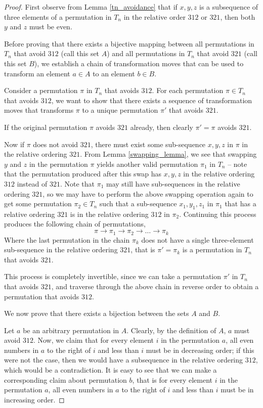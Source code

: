 \documentclass[11pt,letterpaper,twoside,english]{article}
\theoremstyle{theorem}
\theoremstyle{remark}
\begin{document}
\begin{proof}
First observe from Lemma \ref{tn_avoidance} that if $x, y, z$ is a subsequence of three elements of a permutation in $T_n$ in the relative order $312$ or $321$, then both $y$ and $z$ must be even.

Before proving that there exists a bijective mapping between all permutations in $T_n$ that avoid $312$ (call this set $A$) and all permutations in $T_n$ that avoid $321$ (call this set $B$), we establish a chain of transformation moves that can be used to transform an element $a \in A$ to an element $b \in B$.

Consider a permutation $\pi$ in $T_n$ that avoids $312$. For each permutation $\pi \in T_n$ that avoids $312$, we want to show that there exists a sequence of transformation moves that transforms $\pi$ to a unique permutation $\pi'$ that avoids $321$.

If the original permutation $\pi$ avoids $321$ already, then clearly $\pi' = \pi$ avoids $321$.

Now if $\pi$ does not avoid $321$, there must exist some sub-sequence $x, y, z$ in $\pi$ in the relative ordering $321$. From Lemma \ref{swapping_lemma}, we see that swapping $y$ and $z$ in the permutation $\pi$ yields another valid permutation $\pi_1$ in $T_n$ -- note that the permutation produced after this swap has $x, y, z$ in the relative ordering $312$ instead of $321$. Note that $\pi_1$ may still have sub-sequences in the relative ordering $321$, so we may have to perform the above swapping operation again to get some permutation $\pi_2 \in T_n$ such that a sub-sequence $x_1, y_1, z_1$ in $\pi_1$ that has a relative ordering $321$ is in the relative ordering $312$ in $\pi_2$. Continuing this process produces the following chain of permutations,
$$\pi \rightarrow \pi_1 \rightarrow \pi_2 \rightarrow \ldots \rightarrow \pi_k$$
Where the last permutation in the chain $\pi_k$ does not have a single three-element sub-sequence in the relative ordering $321$, that is $\pi' = \pi_k$ is a permutation in $T_n$ that avoids $321$.

This process is completely invertible, since we can take a permutation $\pi'$ in $T_n$ that avoids $321$, and traverse through the above chain in reverse order to obtain a permutation that avoids $312$.

We now prove that there exists a bijection between the sets $A$ and $B$. 

Let $a$ be an arbitrary permutation in $A$. Clearly, by the definition of $A$, $a$ must avoid $312$. Now, we claim that for every element $i$ in the permutation $a$, all even numbers in $a$ to the right of $i$ and less than $i$ must be in decreasing order; if this were not the case, then we would have a subsequence in the relative ordering $312$, which would be a contradiction. It is easy to see that we can make a corresponding claim about permutation $b$, that is for every element $i$ in the permutation $a$, all even numbers in $a$ to the right of $i$ and less than $i$ must be in increasing order.


\end{proof}
\end{document}
